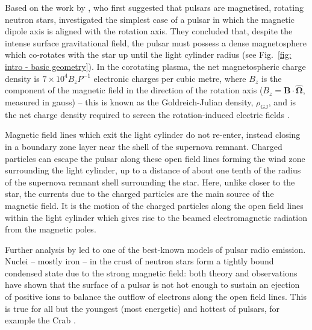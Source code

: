 Based on the work by \citet{Gxxx1968}, who first suggested that pulsars are magnetised, rotating neutron stars, \citet{GJxx1969} investigated the simplest case of a pulsar in which the magnetic dipole axis is aligned with the rotation axis. They concluded that, despite the intense surface gravitational field, the pulsar must possess a dense magnetosphere which co-rotates with the star up until the light cylinder radius (see Fig.~\ref{fig: intro - basic geometry}). In the corotating plasma, the net magnetospheric charge density is $7\times10^4 B_z P^{-1}$ electronic charges per cubic metre, where $B_z$ is the component of the magnetic field in the direction of the rotation axis ($B_z = \mathbf{B}\cdot\mathbf{\hat{\Omega}}$, measured in gauss) -- this is known as the Goldreich-Julian density, $\rho_\mathrm{GJ}$, and is the net charge density required to screen the rotation-induced electric fields \citep{GJxx1969}.

Magnetic field lines which exit the light cylinder do not re-enter, instead closing in a boundary zone layer near the shell of the supernova remnant. Charged particles can escape the pulsar along these open field lines forming the wind zone surrounding the light cylinder, up to a distance of about one tenth of the radius of the supernova remnant shell surrounding the star. Here, unlike closer to the star, the currents due to the charged particles are the main source of the magnetic field. It is the motion of the charged particles along the open field lines within the light cylinder which gives rise to the beamed electromagnetic radiation from the magnetic poles.

Further analysis by \citet{RSxx1975} led to one of the best-known models of pulsar radio emission. Nuclei -- mostly iron -- in the crust of neutron stars form a tightly bound condensed state due to the strong magnetic field: both theory and observations have shown that the surface of a pulsar is not hot enough to sustain an ejection of positive ions to balance the outflow of electrons along the open field lines. This is true for all but the youngest (most energetic) and hottest of pulsars, for example the Crab \citep{RSxx1975}.

